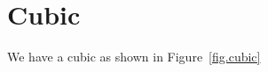 \section{Cubic}
\label{sec.cubic}
\lipsum[7-8] %

We have a cubic as shown in Figure~\ref{fig.cubic}

